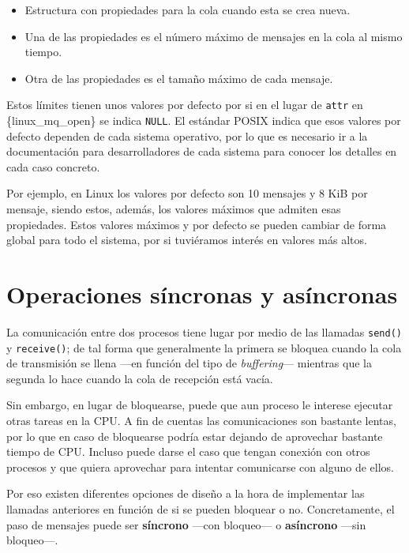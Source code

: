 \begin{itemize}
\item
  Estructura con propiedades para la cola cuando esta se crea nueva.
\item
  Una de las propiedades es el número máximo de mensajes en la cola al
  mismo tiempo.
\item
  Otra de las propiedades es el tamaño máximo de cada mensaje.
\end{itemize}

Estos límites tienen unos valores por defecto por si en el lugar de
\texttt{attr} en \{linux\_mq\_open\} se indica \texttt{NULL}. El
estándar POSIX indica que esos valores por defecto dependen de cada
sistema operativo, por lo que es necesario ir a la documentación para
desarrolladores de cada sistema para conocer los detalles en cada caso
concreto.

Por ejemplo, en Linux los valores por defecto son 10 mensajes y 8 KiB
por mensaje, siendo estos, además, los valores máximos que admiten esas
propiedades. Estos valores máximos y por defecto se pueden cambiar de
forma global para todo el sistema, por si tuviéramos interés en valores
más altos.

\section{Operaciones síncronas y
asíncronas}\label{_operaciones_suxedncronas_y_asuxedncronas}

La comunicación entre dos procesos tiene lugar por medio de las llamadas
\texttt{send()} y \texttt{receive()}; de tal forma que generalmente la
primera se bloquea cuando la cola de transmisión se llena ---en función
del tipo de \emph{buffering}--- mientras que la segunda lo hace cuando
la cola de recepción está vacía.

Sin embargo, en lugar de bloquearse, puede que aun proceso le interese
ejecutar otras tareas en la CPU. A fin de cuentas las comunicaciones son
bastante lentas, por lo que en caso de bloquearse podría estar dejando
de aprovechar bastante tiempo de CPU. Incluso puede darse el caso que
tengan conexión con otros procesos y que quiera aprovechar para intentar
comunicarse con alguno de ellos.

Por eso existen diferentes opciones de diseño a la hora de implementar
las llamadas anteriores en función de si se pueden bloquear o no.
Concretamente, el paso de mensajes puede ser \textbf{{}síncrono} ---con
bloqueo--- o \textbf{{}asíncrono} ---sin bloqueo---.

